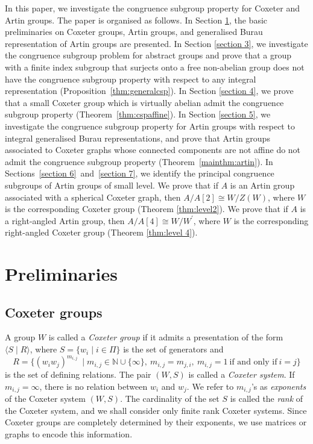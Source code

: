 \documentclass[12pt]{amsart}
\theoremstyle{definition}
\numberwithin{equation}{section}
\begin{document}
In this paper, we investigate the congruence subgroup property for Coxeter and Artin groups. The paper is organised as follows.   In Section \ref{section 2}, the basic preliminaries on Coxeter groups, Artin groups, and generalised Burau representation of Artin groups are presented.  In Section \ref{section 3}, we investigate the congruence subgroup problem for abstract groups and prove that a group with a finite index subgroup that surjects onto a free non-abelian group does not have the congruence subgroup property with respect to any integral representation (Proposition~\ref{thm:generalcsp}). In Section \ref{section 4}, we prove that a small Coxeter group which is virtually abelian admit the congruence subgroup property (Theorem~\ref{thm:cspaffine}).  In Section \ref{section 5}, we investigate the congruence subgroup property for Artin groups with respect to integral generalised Burau representations, and prove that Artin groups associated to Coxeter graphs whose connected components are not affine do not admit the congruence subgroup property (Theorem~\ref{mainthm:artin}). In Sections~\ref {section 6}~and~\ref{section 7}, we identify the principal congruence subgroups of Artin groups of small level. We prove that if $A$ is an Artin group associated with a spherical Coxeter graph, then $A/A[2] \cong W/Z(W)$, where $W$ is the corresponding Coxeter group (Theorem \ref{thm:level2}). We prove that if $A$ is a right-angled Artin group, then $A/A[4] \cong W/W^{'}$, where $W$ is the corresponding  right-angled Coxeter group (Theorem \ref{thm:level 4}).
\section{Preliminaries}\label{section 2}
\medskip


\subsection{Coxeter groups}
A group $W$  is called a {\it Coxeter group} if it admits a  presentation of the form $\big \langle S \mid R \big \rangle$, where $S= \{ w_i \mid i \in \Pi\}$ is the set of generators and 
\begin{equation}\label{Coxeter presentation}
R  = \big \{ (w_iw_j)^{m_{i,j}}~ \mid m_{i,j}\in \mathbb{N} \cup \{\infty\},~m_{i,j}=m_{j,i}, ~m_{i,j} = 1 ~\textrm{if and only if}~ i =j \big\}
\end{equation}
is the set of defining relations. The pair $(W, S)$ is called a  {\it Coxeter system}. If $m_{i,j} = \infty$, there is no relation between $w_i$ and $w_j$. We refer to $m_{i,j}$'s as {\it exponents} of the Coxeter system $(W, S)$. The cardinality of the set $S$ is called the {\it rank} of the Coxeter system, and we shall consider only finite rank Coxeter systems. Since Coxeter groups are completely determined by their exponents, we use matrices or graphs to encode this information.
\end{document}
